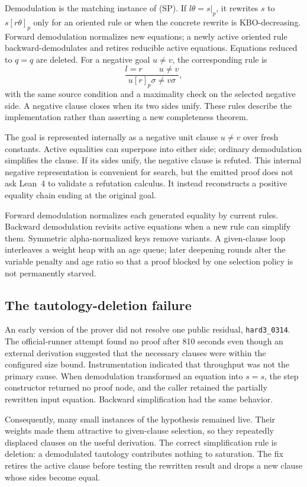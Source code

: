\documentclass[10pt,twocolumn]{article}
\newcommand{\lean}{Lean~4\xspace}
\newcommand{\code}[1]{\texttt{#1}}
\begin{document}
Demodulation is the matching instance of (SP).  If $l\theta=s|_p$, it rewrites
$s$ to $s[r\theta]_p$ only for an oriented rule or when the concrete rewrite is
KBO-decreasing.  Forward demodulation normalizes new equations; a newly active
oriented rule backward-demodulates and retires reducible active equations.
Equations reduced to $q=q$ are deleted.  For a negative goal $u\neq v$, the
corresponding rule is
\[
\frac{l=r \qquad u\neq v}
     {u[r]_p\sigma\neq v\sigma},
\tag{NEG}
\]
with the same source condition and a maximality check on the selected negative
side.  A negative clause closes when its two sides unify.  These rules describe
the implementation rather than asserting a new completeness theorem.

The goal is represented internally as a negative unit clause $u\neq v$ over
fresh constants.  Active equalities can superpose into either side; ordinary
demodulation simplifies the clause.  If its sides unify, the negative clause
is refuted.  This internal negative representation is convenient for search,
but the emitted proof does not ask \lean to validate a refutation calculus.
It instead reconstructs a positive equality chain ending at the original
goal.

Forward demodulation normalizes each generated equality by current rules.
Backward demodulation revisits active equations when a new rule can simplify
them.  Symmetric alpha-normalized keys remove variants.  A given-clause loop
interleaves a weight heap with an age queue; later deepening rounds alter the
variable penalty and age ratio so that a proof blocked by one selection policy
is not permanently starved.

\subsection{The tautology-deletion failure}

An early version of the prover did not resolve one public residual,
\code{hard3\_0314}.  The official-runner attempt found no proof after 810 seconds
even though an external derivation suggested that the necessary clauses were within the
configured size bound.  Instrumentation indicated that throughput was not the
primary cause.  When demodulation transformed an equation into $s=s$, the
step constructor returned no proof node, and the caller retained the partially
rewritten input equation.  Backward simplification had the same behavior.

Consequently, many small instances of the hypothesis remained live.  Their
weights made them attractive to given-clause selection, so they repeatedly
displaced clauses on the useful derivation.  The correct simplification rule
is deletion: a demodulated tautology contributes nothing to saturation.  The
fix retires the active clause before testing the rewritten result and drops a
new clause whose sides become equal.
\end{document}
